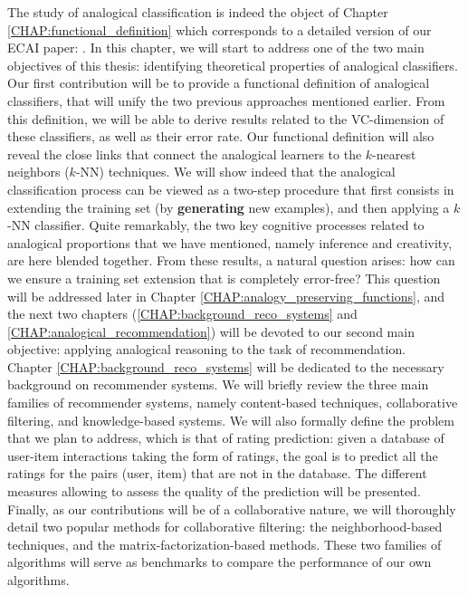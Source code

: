 The study of analogical classification is indeed the object of Chapter
\ref{CHAP:functional_definition} which corresponds to a detailed version of our
ECAI paper: \cite{HugPraRicSerECAI16}. In this chapter, we will start to
address one of the two main objectives of this thesis: identifying theoretical
properties of analogical classifiers. Our first contribution will be to provide
a functional definition of analogical classifiers, that will unify the two
previous approaches mentioned earlier. From this definition, we will be able to
derive results related to the VC-dimension of these classifiers, as well as
their error rate. Our functional definition will also reveal the close links
that connect the analogical learners to the $k$-nearest neighbors ($k$-NN)
techniques. We will show indeed that the analogical classification process can
be viewed as a two-step procedure that first consists in extending the training
set (by \textbf{generating} new examples), and then applying a $k$-NN
classifier. Quite remarkably, the two key cognitive processes related to
analogical proportions that we have mentioned, namely inference and creativity,
are here blended together. From these results, a natural question arises: how
can we ensure a training set extension that is completely error-free? This
question will be addressed later in Chapter
\ref{CHAP:analogy_preserving_functions}, and the next two chapters
(\ref{CHAP:background_reco_systems} and \ref{CHAP:analogical_recommendation})
will be devoted to our second main objective: applying analogical reasoning to
the task of recommendation.\\

Chapter \ref{CHAP:background_reco_systems} will be dedicated to the necessary
background on recommender systems. We will briefly review the three main
families of recommender systems, namely content-based techniques, collaborative
filtering, and knowledge-based systems. We will also formally define the
problem that we plan to address, which is that of rating prediction: given a
database of  user-item interactions taking the form of ratings, the goal is to
predict all the ratings for the pairs (user, item) that are not in the
database. The different measures allowing to assess the quality of the
prediction will be presented. Finally, as our contributions will be of a
collaborative nature, we will thoroughly detail two popular methods for
collaborative filtering: the neighborhood-based techniques, and the
matrix-factorization-based methods. These two families of algorithms will serve
as benchmarks to compare the performance of our own algorithms.\\

